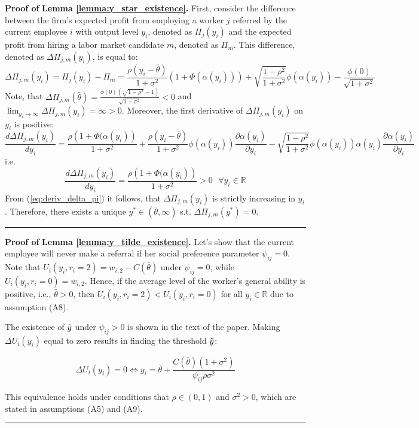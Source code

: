 \documentclass[12pt]{article}
\newenvironment{proof}[1][Proof of]{\noindent\textbf{#1} }{\ \rule{0.5em}{0.5em}}
\begin{document}
\begin{proof}
    \textbf{Lemma \ref{lemma:y_star_existence}.}
    First, consider the difference between the firm's expected profit from employing a worker $j$ referred by the current employee $i$ with output level $y_i$, denoted as $\Pi_j(y_i)$ and the expected profit from hiring a labor market candidate $m$, denoted as $\Pi_m$. This difference, denoted as $\Delta\Pi_{j,m}(y_i)$, is equal to:
\begin{equation*}
    \Delta\Pi_{j,m}(y_i) = \Pi_j(y_i) - \Pi_m
    = \frac{\rho\left(y_i-\bar{\theta}\right)}{1+\sigma^2}\left(1+\Phi\left(\alpha(y_i)\right)\right)
    + \sqrt{\frac{1-\rho^2}{1+\sigma^2}}\phi\left(\alpha(y_i)\right) - \frac{\phi(0)}{\sqrt{1+\sigma^2}}
\end{equation*}
Note, that $\Delta\Pi_{j,m}(\bar{\theta}) = \frac{\phi(0)(\sqrt{1-\rho^2}-1)}{\sqrt{1+\sigma^2}}<0$ and $\lim_{y_i \rightarrow \infty}{\Delta\Pi_{j,m}(y_i) = \infty>0}$. Moreover, the first derivative of $\Delta\Pi_{j,m}(y_i)$ on $y_i$ is positive:
\begin{equation*}
    \frac{d\Delta\Pi_{j,m}(y_i)}{dy_i} = \frac{\rho\left( 1+ \Phi(\alpha(y_i) \right)}{1+\sigma^2}
    +
    \frac{\rho \left( y_i - \bar{\theta} \right)}{1+\sigma^2}\phi(\alpha(y_i))\frac{\partial \alpha(y_i)}{\partial y_i}
    -
    \sqrt{\frac{1-\rho^2}{1+\sigma^2}}\phi(\alpha(y_i))\alpha(y_i)\frac{\partial \alpha(y_i)}{\partial y_i}
\end{equation*}
i.e.
\begin{equation}\label{eq:deriv_delta_pi}
    \frac{d\Delta\Pi_{j,m}(y_i)}{dy_i} = \frac{\rho\left( 1+ \Phi(\alpha(y_i) \right)}{1+\sigma^2} >0 \text{   } \forall y_i \in \mathbb{R}
\end{equation}
From (\ref{eq:deriv_delta_pi}) it follows, that $\Delta\Pi_{j,m}(y_i)$ is strictly increasing in $y_i$. Therefore, there exists a unique $y^* \in (\bar{\theta},\infty)$ s.t. $\Delta\Pi_{j,m}(y^*) = 0$.
\end{proof}

\begin{proof}
   \textbf{ Lemma \ref{lemma:y_tilde_existence}.}
   Let's show that the current employee will never make a referral if her social preference parameter $\psi_{ij} = 0$. Note that $U_i(y_i, r_i = 2) = w_{i,2}-C(\bar{\theta})$ under $\psi_{ij} = 0$, while $U_i(y_i, r_i = 0) = w_{i,2}$. Hence, if the average level of the worker's general ability is positive, i.e., $\bar{\theta} >0$, then $U_i(y_i, r_i = 2) < U_i(y_i, r_i = 0)$ for all $y_i \in \mathbb{R}$ due to assumption (A8).

    The existence of $\Tilde{y}$ under $\psi_{ij}>0$ is shown in the text of the paper. Making $\Delta U_i(y_i)$ equal to zero results in finding the threshold $\Tilde{y}$:

    \begin{equation*}
        \Delta U_i(y_i) = 0 \Leftrightarrow y_i = \bar{\theta} + \frac{C(\bar{\theta})(1+\sigma^2)}{\psi_{ij}\rho\sigma^2}
    \end{equation*}

This equivalence holds under conditions that $\rho \in (0,1)$ and $\sigma^2 >0$, which are stated in  assumptions (A5) and (A9).
\end{proof}
\end{document}
